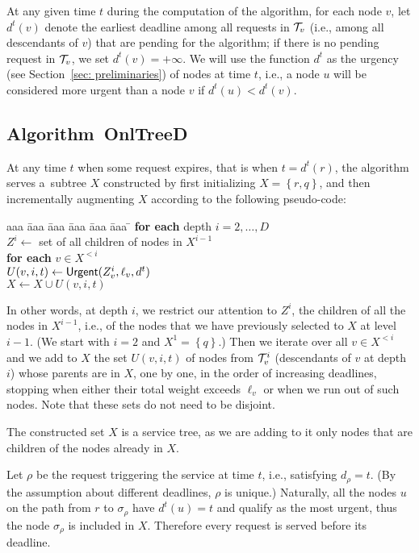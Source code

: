 \documentclass[a4paper]{article}
\newcommand{\calT}{{\cal T}}
\newcommand{\braced}[1]{{ \left\{ #1 \right\} }}
\newcommand{\length}{\ell}
\newcommand{\OnAlgTreesDeadlines}{{\sc OnlTreeD}}
\newcommand{\trignode}{\sigma}
\newcommand{\urgentnodes}{\mbox{\rm\textsf{Urgent}}}
\begin{document}
At any given time $t$ during the computation of the algorithm, for
each node $v$, let $d^t(v)$ denote the earliest deadline among all
requests in $\calT_v$ (i.e., among all descendants of $v$) that are
pending for the algorithm; if there is no pending request in
$\calT_v$, we set $d^t(v)=+\infty$.  We will use the function $d^t$ as
the urgency (see Section~\ref{sec: preliminaries})
of nodes at time $t$, i.e., a node $u$ will be
considered more urgent than a node $v$ if $d^t(u)<d^t(v)$.


\subsection{Algorithm~{\OnAlgTreesDeadlines}}

At any time $t$ when some request expires, that is when  $t=d^t(r)$, the
algorithm serves a~subtree $X$ constructed by first initializing
$X = \braced{r,q}$, and then incrementally augmenting $X$
according to the following pseudo-code:

\begin{tabbing}
aaa \= aaa \= aaa \= aaa \= aaa \= aaa \= \kill
\> \textbf{for each} depth $i=2,\ldots,D$\\
\> \> $Z^i\gets$ set of all children of nodes in $X^{i-1}$ \\
\> \> \textbf{for each} $v\in X^{<i}$ \\
\> \> \> $U(v,i,t) \gets \urgentnodes(Z^i_v,\length_v,d^t)$ \\
\> \> \> $X \gets X \cup U(v,i,t)$
\end{tabbing}

In other words, at depth $i$, we restrict our attention to $Z^i$, the
children of all the nodes in $X^{i-1}$, i.e., of the nodes that we
have previously selected to $X$ at level $i-1$. (We start with $i=2$
and $X^1=\braced{q}$.) Then we iterate over all $v\in X^{<i}$ and
we add to $X$ the set $U(v,i,t)$ of nodes from $\calT^i_v$
(descendants of $v$ at depth $i$) whose parents are in $X$, one by
one, in the order of increasing deadlines, stopping when either their
total weight exceeds $\length_v$ or when we run out of such
nodes. Note that these sets do not need to be disjoint.

The constructed set $X$ is a service tree, as we are adding to it only
nodes that are children of the nodes already in $X$.

Let $\rho$ be the request triggering the service at time $t$, i.e.,
satisfying $d_\rho=t$.  (By the assumption about different deadlines,
$\rho$ is unique.)  Naturally, all the nodes $u$ on the path from $r$
to $\trignode_\rho$ have $d^t(u)=t$ and qualify as the most urgent,
thus the node $\trignode_\rho$ is included in $X$. Therefore every
request is served before its deadline.
\end{document}
